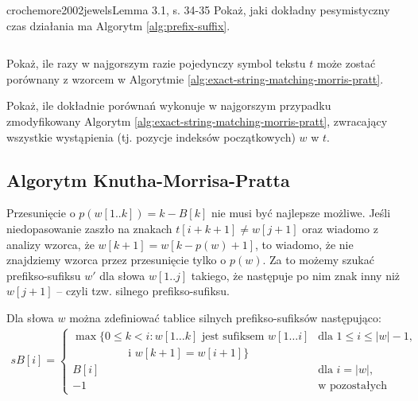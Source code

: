 \begin{problem}{crochemore2002jewels}{Lemma 3.1, s. 34-35}
  Pokaż, jaki dokładny pesymistyczny czas działania ma Algorytm \ref{alg:prefix-suffix}.
\end{problem}


\begin{code}
\inputminted{python}{code/exact-string-matching/morris-pratt.py}
\label{alg:exact-string-matching-morris-pratt}
\end{code}

\begin{problem}{}{}
  Pokaż, ile razy w najgorszym razie pojedynczy symbol tekstu $t$ może zostać porównany z wzorcem w Algorytmie \ref{alg:exact-string-matching-morris-pratt}.
\end{problem}

\begin{problem}{}{}
  Pokaż, ile dokładnie porównań wykonuje w najgorszym przypadku zmodyfikowany Algorytm \ref{alg:exact-string-matching-morris-pratt}, zwracający wszystkie wystąpienia (tj. pozycje indeksów początkowych) $w$ w $t$.
\end{problem}

\subsection{Algorytm Knutha-Morrisa-Pratta}

Przesunięcie o $p(w[1..k]) = k - B[k]$ nie musi być najlepsze możliwe. Jeśli niedopasowanie zaszło na znakach $t[i + k + 1] \neq w[j + 1]$ oraz wiadomo z analizy wzorca, że $w[k + 1] = w[k - p(w) + 1]$, to wiadomo, że nie znajdziemy wzorca przez przesunięcie tylko o $p(w)$. Za to możemy szukać prefikso-sufiksu $w'$ dla słowa $w[1..j]$ takiego, że następuje po nim znak inny niż $w[j + 1]$ -- czyli tzw. silnego prefikso-sufiksu.

Dla słowa $w$ można zdefiniować tablice silnych prefikso-sufiksów następująco:
\begin{align*}
  sB[i] = 
  \begin{cases}
    \max\{0 \le k < i:\text{$w[1 \ldots k]$ jest sufiksem $w[1\ldots i]$} & \text{dla $1 \le i \le |w| - 1$,} \\
    \qquad\qquad\quad\text{i $w[k + 1] = w[i + 1]$}\} \\
    B[i] & \text{dla $i = |w|$,} \\
    -1 & \text{w pozostałych przypadkach.}
  \end{cases}
\end{align*}

